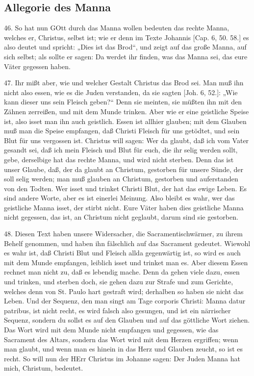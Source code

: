 \subsection{Allegorie des Manna}

46. So hat nun GOtt durch das Manna wollen bedeuten das rechte Manna, welches er, Christus, selbst ist; wie er denn im Texte Johannis [Cap. 6, 50. 58.] es also deutet und spricht: „Dies ist das Brod“, und zeigt auf das große Manna, auf sich selbst; als sollte er sagen: Da werdet ihr finden, was das Manna sei, das eure Väter gegessen haben.

47. Ihr mißt aber, wie und welcher Gestalt Christus das Brod sei. Man muß ihn nicht also essen, wie es die Juden verstanden, da sie
sagten [Joh. 6, 52.]: „Wie kann dieser uns sein Fleisch geben?“ Denn sie meinten, sie müßten ihn mit den Zähnen zerreißen, und mit dem Munde trinken. Aber wie er eine geistliche Speise ist, also isset man ihn auch geistlich. Essen ist allhier glauben; mit dem Glauben muß man die Speise empfangen, daß Christi Fleisch für uns getödtet, und sein Blut für uns vergossen ist. Christus will sagen: Wer da glaubt, daß ich vom Vater gesandt sei, daß ich mein Fleisch und Blut für euch, die ihr selig werden sollt, gebe, derselbige hat das rechte Manna, und wird nicht sterben. Denn das ist unser Glaube, daß, der da glaubt an Christum, gestorben für unsere Sünde, der soll selig werden; man muß glauben an Christum, gestorben und auferstanden von den Todten. Wer isset und trinket Christi Blut, der hat das ewige Leben. Es sind andere Worte, aber es ist einerlei Meinung. Also bleibt es wahr, wer das geistliche Manna isset, der stirbt nicht. Eure Väter haben dies geistliche Manna nicht gegessen, das ist, an Christum nicht geglaubt, darum sind sie gestorben.

48. Diesen Text haben unsere Widersacher, die Sacramentischwärmer, zu ihrem Behelf genommen, und haben ihn fälschlich auf das Sacrament gedeutet. Wiewohl es wahr ist, daß Christi Blut und Fleisch allda gegenwärtig ist, so wird es auch mit dem Munde empfangen, leiblich isset und trinket man es. Aber diesem Essen rechnet man nicht zu, daß es lebendig mache. Denn da gehen viele dazu, essen und trinken, und sterben doch, sie gehen dazu zur Strafe und zum Gerichte, welches denn von St. Paulo hart gestraft wird; derhalben so haben sie nicht das Leben. Und der Sequenz, den man singt am Tage corporis Christi: Manna datur patribus, ist nicht recht, es wird falsch also gesungen, und ist ein närrischer Sequenz, sondern du sollst es auf den Glauben und auf das göttliche Wort ziehen. Das Wort wird mit dem Munde nicht empfangen und gegessen, wie das Sacrament des Altars, sondern das Wort wird mit dem Herzen ergriffen; wenn man glaubt, und wenn man es hinein in das Herz und Glauben zeucht, so ist es recht. So will nun der HErr Christus im Johanne sagen: Der Juden Manna hat mich, Christum, bedeutet.

